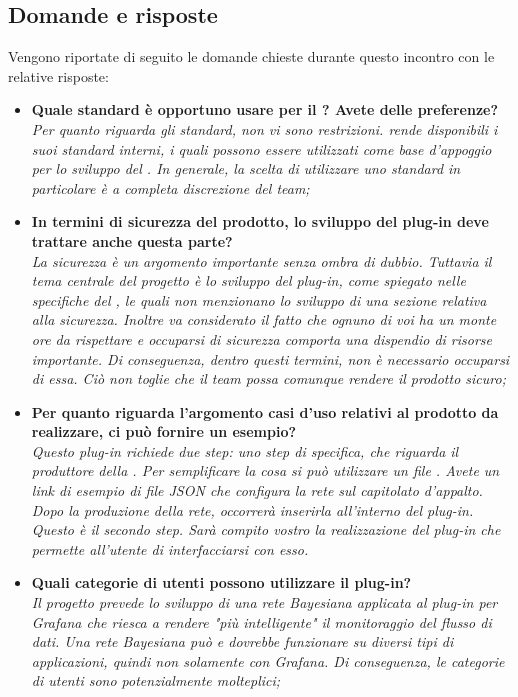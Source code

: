 \subsection{Domande e risposte}
Vengono riportate di seguito le domande chieste durante questo incontro con le relative risposte: 
\begin{itemize}
\item\textbf{Quale standard è opportuno usare per il ? Avete delle preferenze?}\\
\emph{Per quanto riguarda gli standard, non vi sono restrizioni.   rende disponibili i suoi standard interni, i quali possono essere utilizzati come base d'appoggio per lo sviluppo del . In generale, la scelta di utilizzare uno standard in particolare è a completa discrezione del team;}

\item\textbf{In termini di sicurezza del prodotto, lo sviluppo del plug-in deve trattare anche questa parte?}\\
\emph{La sicurezza è un argomento importante senza ombra di dubbio. Tuttavia il tema centrale del progetto è lo sviluppo del plug-in, come spiegato nelle specifiche del , le quali non menzionano lo sviluppo di una sezione relativa alla sicurezza. Inoltre va considerato il fatto che ognuno di voi ha un monte ore da rispettare e occuparsi di sicurezza comporta una dispendio di risorse importante. Di conseguenza, dentro questi termini, non è necessario occuparsi di essa. Ciò non toglie che il team possa comunque rendere il prodotto sicuro;}

\item\textbf{Per quanto riguarda l'argomento casi d'uso relativi al prodotto da realizzare, ci può fornire un esempio?}\\
\emph{Questo plug-in richiede due step: uno step di specifica, che riguarda il produttore della . Per semplificare la cosa si può utilizzare un file . Avete un link di esempio di file JSON che configura la rete sul capitolato d'appalto.\\
Dopo la produzione della rete, occorrerà inserirla all'interno del plug-in. Questo è il secondo step. Sarà compito vostro la realizzazione del plug-in che permette all'utente di interfacciarsi con esso. }
\item\textbf{Quali categorie di utenti possono utilizzare il plug-in?} \\
\emph{Il progetto prevede lo sviluppo di una rete Bayesiana applicata al plug-in per Grafana che riesca a rendere "più intelligente" il monitoraggio del flusso di dati. Una rete Bayesiana può e dovrebbe funzionare su diversi tipi di applicazioni, quindi non solamente con Grafana. Di conseguenza, le categorie di utenti sono potenzialmente molteplici;}


\end{itemize}
